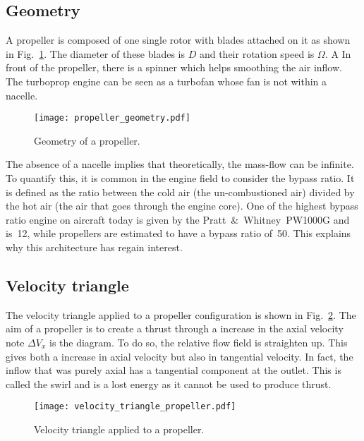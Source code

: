 
\subsection{Geometry}
\label{sub:cror_propeller_geometry}

A propeller is composed of one single rotor with blades
attached on it as shown in
Fig.~\ref{fig:cror_propeller_geometry}. 
The diameter of these blades is $D$
and their rotation speed is $\Omega$. 
A In front of the propeller, there is a spinner which helps
smoothing the air inflow.
The turboprop engine can be seen as
a turbofan whose fan is not within a nacelle.
\begin{figure}[htb]
  \centering
  \texttt{[image: propeller\_geometry.pdf]}
  \caption{Geometry of a propeller.}
  \label{fig:cror_propeller_geometry}
\end{figure}
The absence of a nacelle implies that theoretically, the mass-flow can be
infinite. To quantify this, it is common in the engine field to
consider the bypass ratio. It is defined as the ratio between the
cold air (the un-combustioned air)
divided by the hot air (the air that goes through the engine core).
One of the highest bypass ratio engine on aircraft today is given
by the Pratt~\&~Whitney~PW1000G and is~12, while propellers are estimated
to have a bypass ratio of~50. This explains why this architecture has
regain interest.

\subsection{Velocity triangle}
\label{sub:cror_propeller_velocity_triangle}
The velocity triangle applied to a propeller configuration
is shown in Fig.~\ref{fig:cror_velocity_triangle_propeller}.
The aim of a propeller is to create a thrust through a increase
in the axial velocity note $\Delta V_x$ is the diagram. To do
so, the relative flow field is straighten up. This gives both
a increase in axial velocity but also in tangential velocity.
In fact, the inflow that was purely axial has a tangential
component at the outlet. This is called the swirl and
is a lost energy as it cannot be used to produce thrust.
\begin{figure}[htbp]
  \centering
  \texttt{[image: velocity\_triangle\_propeller.pdf]}
  \caption{Velocity triangle applied to a propeller.}
  \label{fig:cror_velocity_triangle_propeller}
\end{figure}

